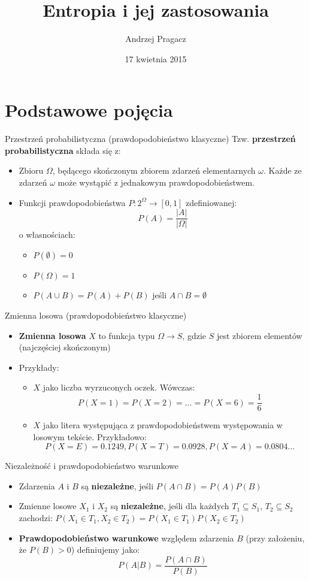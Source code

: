 \documentclass{beamer}
\title{Entropia i jej zastosowania}
\author{Andrzej Pragacz}
\date{17 kwietnia 2015}
\begin{document}
\titlepage

\section{Podstawowe pojęcia}

\begin{frame}{Przestrzeń probabilistyczna (prawdopodobieństwo klasyczne)}
Tzw. \textbf{przestrzeń probabilistyczna} składa się z:
\begin{itemize}
  \item Zbioru $\Omega$, będącego skończonym zbiorem zdarzeń
  elementarnych $\omega$. Każde ze zdarzeń $\omega$ może wystąpić z jednakowym
  prawdopodobieństwem.
  \item Funkcji prawdopodobieństwa $P: 2^\Omega \to [0, 1]$ zdefiniowanej:
  $$
  P(A) = \frac{|A|}{|\Omega|}
  $$
  o własnościach:
  \begin{itemize}
    \item $P(\emptyset) = 0$
    \item $P(\Omega) = 1$
    \item $P(A \cup B) = P(A) + P(B)$ jeśli $A \cap B = \emptyset$
  \end{itemize}
\end{itemize}
\end{frame}

\begin{frame}{Zmienna losowa (prawdopodobieństwo klasyczne)}
\begin{itemize}
  \item \textbf{Zmienna losowa} $X$ to funkcja typu $\Omega \to S$, gdzie $S$ jest
  zbiorem elementów (najczęściej skończonym)
  \item Przykłady:
  \begin{itemize}
    \item $X$ jako liczba wyrzuconych oczek. Wówczas: $$P(X=1) = P(X=2) = \ldots = P(X=6) = \frac{1}{6}$$
    \item $X$ jako litera występująca z prawdopodobieństwem występowania
    w losowym tekście. Przykładowo:
    $$ P(X=E) = 0.1249, P(X=T) = 0.0928, P(X=A) = 0.0804 \ldots$$
  \end{itemize}
\end{itemize}
\end{frame}

\begin{frame}{Niezależność i prawdopodobieństwo warunkowe}
\begin{itemize}
  \item Zdarzenia $A$ i $B$ są \textbf{niezależne}, jeśli $P(A \cap B) = P(A) P(B)$
  \item Zmienne losowe $X_1$ i $X_2$ są \textbf{niezależne}, jeśli dla każdych
  $T_1 \subseteq S_1$, $T_2 \subseteq S_2$ zachodzi:
  $P(X_1 \in T_1, X_2 \in T_2) = P(X_1 \in T_1) P(X_2 \in T_2)$
  \item \textbf{Prawdopodobieństwo warunkowe} względem zdarzenia $B$
  (przy założeniu, że $P(B) > 0$) definiujemy jako:
  $$
  P(A|B) = \frac{P(A \cap B)}{P(B)}
  $$
\end{itemize}
\end{frame}
\end{document}
